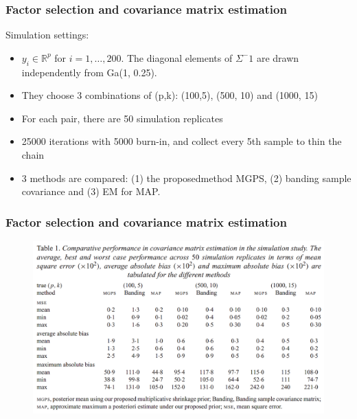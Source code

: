 \documentclass{beamer}
\begin{document}
	\begin{frame}
		\frametitle{Factor selection and covariance matrix estimation}
		Simulation settings:
		\begin{itemize}
			\item 
			$y_i \in \mathbb{R}^p$ for $i=1,\ldots,200$. The diagonal elements of $\Sigma^-1$ are drawn independently from Ga(1, 0.25).
			\item
			They choose 3 combinations of (p,k): (100,5), (500, 10) and (1000, 15)
			\item
			For each pair, there are 50 simulation replicates
			\item
			25000 iterations with 5000 burn-in, and collect every 5th sample to thin the chain
			\item
			3 methods are compared: (1) the proposedmethod MGPS, (2) banding sample covariance and (3) EM for MAP.
		\end{itemize}
	\end{frame}
	
	\begin{frame}
		\frametitle{Factor selection and covariance matrix estimation}
		\begin{figure}
			\includegraphics[width=0.9\linewidth]{image004.png}
		\end{figure}
	\end{frame}
	
\end{document}
